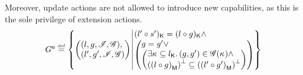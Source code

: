 Moreover, update actions are not allowed to introduce new
capabilities, as this is the sole privilege of extension actions.
\vspace{-1ex}
\[
	\updateG \eqdef
 	\left\{
	\begin{array}{@{} l @{\hspace*{2pt}} | @{\hspace*{2pt}} r @{}}
	   	\left(
	   	\begin{array}{@{} l @{}}
	     	(l, g, \lmod, \gmod),\\
	     	(l', g', \lmod, \gmod)
	   	\end{array}
		\right)
	  	&
	  	\begin{array}{@{} l @{} }
	  		\capPart{(l' \composeL s')}  = \capPart{(l \composeL g)} \land\\
		  	\left(
		  	\begin{array}{@{} l @{} }
		 		g = g' \lor\\
		 	  	\left(
		 	  	\begin{array}{@{} l @{}}
		 	  		\exsts{\ca{} \subseteq \capPart{l}}
		 	  		(g, g') \in \gmod(\ca{}) \land\\
		 	  	
		 	  	\heapSize{\heapPart{\left(l \composeL g\right)}} \subseteq 
		 	  	\heapSize{\heapPart{\left(l' \composeL g'\right)}}
		 	  	\end{array}	
		 	  	\right)
		 	\end{array}
	   		\right)
   		\end{array}
 	\end{array}
	\right\}
\]
